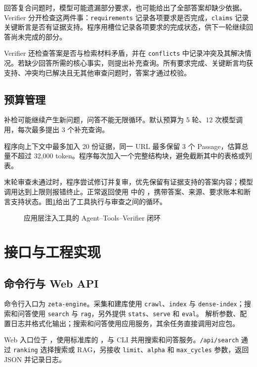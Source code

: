 \documentclass[UTF8,zihao=-4,fontset=fandol]{ctexart}
\newcommand{\passage}{Passage}
\newcommand{\code}[1]{\texttt{#1}}
\begin{document}
回答复合问题时，模型可能遗漏部分要求，也可能给出了全部答案却缺少依据。Verifier 分开检查这两件事：\code{requirements} 记录各项要求是否完成，\code{claims} 记录关键断言是否有证据支持。程序用槽位记录各项要求的完成状态，供下一轮继续回答尚未完成的部分。

Verifier 还检查答案是否与检索材料矛盾，并在 \code{conflicts} 中记录冲突及其解决情况。若缺少回答所需的核心事实，则提出补充查询。所有要求完成、关键断言均获支持、冲突均已解决且无其他审查问题时，答案才通过校验。

\subsection{预算管理}

补检可能继续产生新问题，问答不能无限循环。默认预算为 5 轮、12 次模型调用，每次最多提出 3 个补充查询。

程序向上下文中最多加入 20 份证据，同一 URL 最多保留 3 个 \passage{}，估算总量不超过 32,000 token。程序每次加入一个完整结构块，避免截断其中的表格或列表。

末轮审查未通过时，程序尝试修订并复审，优先保留有证据支持的答案内容；模型调用达到上限则报错终止。正常返回使用  中的 ，携带答案、来源、要求账本和断言支持状态。图\ref{fig:rag-loop}给出了工具执行与审查之间的循环。

\begin{figure}[H]
\centering
\resizebox{\textwidth}{!}{}
\caption{应用层注入工具的 Agent--Tools--Verifier 闭环}
\label{fig:rag-loop}
\end{figure}

\section{接口与工程实现}

\subsection{命令行与 Web API}

命令行入口为 \code{zeta-engine}。采集和建库使用 \code{crawl}、\code{index} 与 \code{dense-index}；搜索和问答使用 \code{search} 与 \code{rag}，另外提供 \code{stats}、\code{serve} 和 \code{eval}。 解析参数、配置日志并格式化输出；搜索和问答使用应用服务，其余任务直接调用对应包。

Web 入口位于 ，使用标准库的 ，与 CLI 共用搜索和问答服务。\code{/api/search} 通过 \code{ranking} 选择搜索或 RAG，另接收 \code{limit}、\code{alpha} 和 \code{max\_cycles} 参数，返回 JSON 并记录日志。
\end{document}
